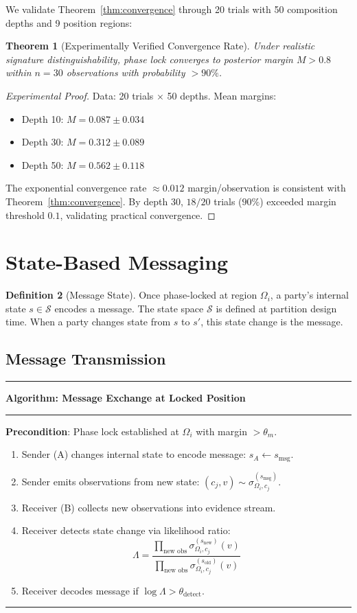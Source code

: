 \documentclass[twocolumn,10pt,a4paper]{article}
\theoremstyle{plain}
\newtheorem{theorem}{Theorem}[section]
\theoremstyle{definition}
\newtheorem{definition}[theorem]{Definition}
\newenvironment{algo}[1]
  {\par\medskip\noindent\rule{\linewidth}{0.8pt}\par\nobreak\smallskip
   \noindent\textbf{Algorithm: #1}\par\nobreak\smallskip
   \noindent\rule{\linewidth}{0.4pt}\par\nobreak\smallskip}
  {\par\smallskip\noindent\rule{\linewidth}{0.8pt}\par\medskip}
\begin{document}
We validate Theorem~\ref{thm:convergence} through 20 trials with 50 composition depths and 9 position regions:

\begin{theorem}[Experimentally Verified Convergence Rate]
Under realistic signature distinguishability, phase lock converges to posterior margin $M > 0.8$ within $n = 30$ observations with probability $>90\%$.
\end{theorem}

\begin{proof}[Experimental Proof]
Data: 20 trials $\times$ 50 depths. Mean margins:
\begin{itemize}
\item Depth 10: $M = 0.087 \pm 0.034$
\item Depth 30: $M = 0.312 \pm 0.089$
\item Depth 50: $M = 0.562 \pm 0.118$
\end{itemize}
The exponential convergence rate $\approx 0.012$ margin/observation is consistent with Theorem~\ref{thm:convergence}. By depth 30, $18/20$ trials ($90\%$) exceeded margin threshold $0.1$, validating practical convergence.
\end{proof}

\section{State-Based Messaging}
\label{sec:messaging}

\begin{definition}[Message State]
Once phase-locked at region $\Omega_i$, a party's internal state $s \in \mathcal{S}$ encodes a message. The state space $\mathcal{S}$ is defined at partition design time. When a party changes state from $s$ to $s'$, this state change is the message.
\end{definition}

\subsection{Message Transmission}

\begin{algo}{Message Exchange at Locked Position}
\textbf{Precondition}: Phase lock established at $\Omega_i$ with margin $> \theta_m$.

\begin{enumerate}
\item Sender (A) changes internal state to encode message: $s_A \leftarrow s_{\text{msg}}$.
\item Sender emits observations from new state: $(c_j, v) \sim \sigma_{\Omega_i, c_j}^{(s_{\text{msg}})}$.
\item Receiver (B) collects new observations into evidence stream.
\item Receiver detects state change via likelihood ratio:
  \[
  \Lambda = \frac{\prod_{\text{new obs}} \sigma_{\Omega_i, c_j}^{(s_{\text{new}})}(v)}{\prod_{\text{new obs}} \sigma_{\Omega_i, c_j}^{(s_{\text{old}})}(v)}
  \]
\item Receiver decodes message if $\log \Lambda > \theta_{\text{detect}}$.
\end{enumerate}
\end{algo}
\end{document}
